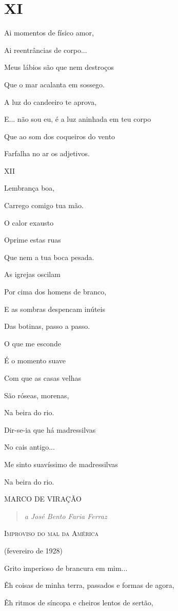 \pagebreak
\section{XI}

Ai momentos de físico amor,

Ai reentrâncias de corpo...

Meus lábios são que nem destroços

Que o mar acalanta em sossego.

A luz do candeeiro te aprova,

E... não sou eu, é a luz aninhada em teu corpo

Que ao som dos coqueiros do vento

Farfalha no ar os adjetivos.

XII

Lembrança boa,

Carrego comigo tua mão.

O calor exausto

Oprime estas ruas

Que nem a tua boca pesada.

As igrejas oscilam

Por cima dos homens de branco,

E as sombras despencam inúteis

Das botinas, passo a passo.

O que me esconde

É o momento suave

Com que as casas velhas

São róseas, morenas,

Na beira do rio.

Dir-se-ia que há madressilvas

No cais antigo...

Me sinto suavíssimo de madressilvas

Na beira do rio.

\textsc{MARCO DE VIRAÇÃO}

\begin{quote}
\emph{a José Bento Faria Ferraz}
\end{quote}

\textsc{Improviso do mal da América}

(fevereiro de 1928)

Grito imperioso de brancura em mim...

Êh coisas de minha terra, passados e formas de agora,

Êh ritmos de síncopa e cheiros lentos de sertão,

